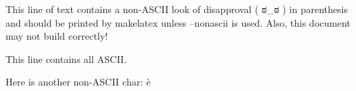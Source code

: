 \documentclass[letterpaper,12pt]{article}
\begin{document}
This line of text contains a non-ASCII look of disapproval ( ಠ_ಠ ) in parenthesis and should be printed by makelatex unless --nonascii is used. Also, this document may not build correctly!

This line contains all ASCII.

Here is another non-ASCII char: è
\end{document}
